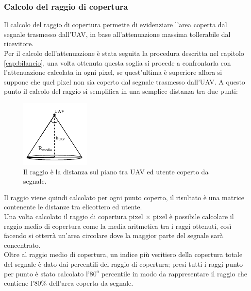 \subsubsection{Calcolo del raggio di copertura}
Il calcolo del raggio di copertura permette di evidenziare l'area coperta dal segnale trasmesso dall'\ac{UAV}, in base all'attenuazione
massima tollerabile dal ricevitore. \\
Per il calcolo dell'attenuazione è stata seguita la procedura descritta nel capitolo \ref{cap:bilancio}, una volta ottenuta questa soglia
si procede a confrontarla con l'attenuazione calcolata in ogni pixel, se quest'ultima è superiore allora si suppone che quel pixel non
sia coperto dal segnale trasmesso dall'\ac{UAV}.
A questo punto il calcolo del raggio si semplifica in una semplice distanza tra due punti:
\begin{figure}[h]
\centering
\includegraphics[height=0.3\textwidth]{Immagini/raggio}
\caption{Il raggio è la distanza sul piano tra \ac{UAV} ed utente coperto da segnale.}
\label{img:raggio}
\end{figure}
Il raggio viene quindi calcolato per ogni punto coperto, il risultato è una matrice contenente le distanze tra elicottero ed utente. \\

Una volta calcolato il raggio di copertura pixel $\times$ pixel è possibile calcolare il raggio medio di copertura come la media 
aritmetica tra i raggi ottenuti, così facendo si otterrà un'area circolare dove la maggior parte del segnale sarà concentrato. \\
Oltre al raggio medio di copertura, un indice più veritiero della copertura totale del segnale è dato dai percentili del raggio di 
copertura; presi tutti i raggi punto per punto è stato calcolato l'$80^o$ percentile in modo da rappresentare il raggio che contiene 
l'$80\%$ dell'area coperta da segnale.

